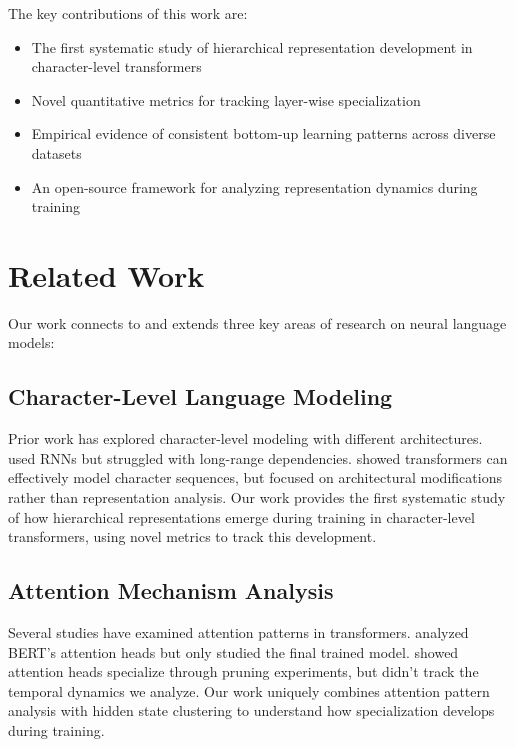 \documentclass{article} %
\begin{document}
The key contributions of this work are:
\begin{itemize}
    \item The first systematic study of hierarchical representation development in character-level transformers
    \item Novel quantitative metrics for tracking layer-wise specialization
    \item Empirical evidence of consistent bottom-up learning patterns across diverse datasets
    \item An open-source framework for analyzing representation dynamics during training
\end{itemize}

\section{Related Work}
\label{sec:related}

Our work connects to and extends three key areas of research on neural language models:

\subsection{Character-Level Language Modeling}
Prior work has explored character-level modeling with different architectures. \citep{Sutskever2011GeneratingTW} used RNNs but struggled with long-range dependencies. \citep{Al-Rfou2018CharacterLevelLM} showed transformers can effectively model character sequences, but focused on architectural modifications rather than representation analysis. Our work provides the first systematic study of how hierarchical representations emerge during training in character-level transformers, using novel metrics to track this development.

\subsection{Attention Mechanism Analysis}
Several studies have examined attention patterns in transformers. \citep{Clark2019WhatDB} analyzed BERT's attention heads but only studied the final trained model. \citep{Voita2019AnalyzingMS} showed attention heads specialize through pruning experiments, but didn't track the temporal dynamics we analyze. Our work uniquely combines attention pattern analysis with hidden state clustering to understand how specialization develops during training.
\end{document}
